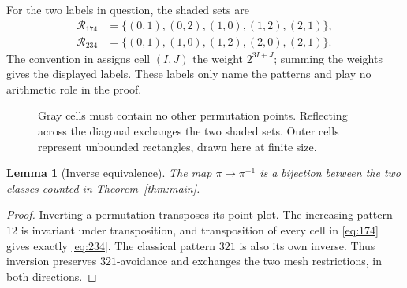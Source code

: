 \documentclass[11pt,a4paper]{article}
\newtheorem{lemma}[theorem]{Lemma}
\theoremstyle{definition}
\theoremstyle{remark}
\newcommand{\Rone}{\mathcal{R}_{174}}
\newcommand{\Rtwo}{\mathcal{R}_{234}}
\begin{document}
For the two labels in question, the shaded sets are
\begin{align}
 \Rone&=\{(0,1),(0,2),(1,0),(1,2),(2,1)\},\label{eq:174}\\
 \Rtwo&=\{(0,1),(1,0),(1,2),(2,0),(2,1)\}.\label{eq:234}
\end{align}
The convention in \cite{seqfan} assigns cell $(I,J)$ the weight
$2^{3I+J}$; summing the weights gives the displayed labels. These labels
only name the patterns and play no arithmetic role in the proof.

\begin{figure}[ht]
\centering
{}
\caption{Gray cells must contain no other permutation points. Reflecting
across the diagonal exchanges the two shaded sets. Outer cells represent
unbounded rectangles, drawn here at finite size.}
\label{fig:mesh}
\end{figure}

\begin{lemma}[Inverse equivalence]\label{lem:inverse}
The map $\pi\mapsto\pi^{-1}$ is a bijection between the two classes counted
in Theorem~\ref{thm:main}.
\end{lemma}
\begin{proof}
Inverting a permutation transposes its point plot. The increasing pattern
$12$ is invariant under transposition, and transposition of every cell in
\eqref{eq:174} gives exactly \eqref{eq:234}. The classical pattern $321$
is also its own inverse. Thus inversion preserves $321$-avoidance and
exchanges the two mesh restrictions, in both directions.
\end{proof}
\end{document}

